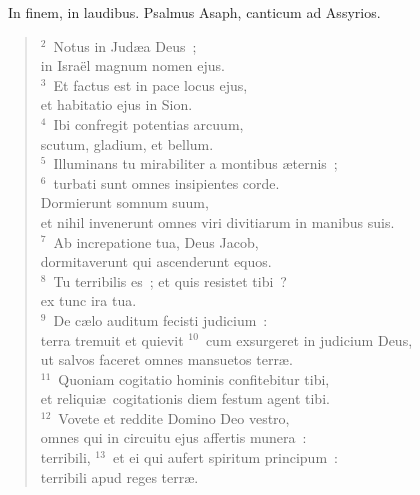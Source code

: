 ~\lettrine[lines=10,image=true,loversize=0.05,lraise=-0.03]{I}{}n finem, in laudibus. Psalmus Asaph, canticum ad Assyrios.
\begin{flushleft}\begin{verse}\vspace{6pt}${}^{2}$~Notus in Jud\ae a Deus~;\\ in Isra\"el magnum nomen ejus.\\
${}^{3}$~Et factus est in pace locus ejus,\\ et habitatio ejus in Sion.\\
${}^{4}$~Ibi confregit potentias arcuum,\\ scutum, gladium, et bellum.\\
${}^{5}$~Illuminans tu mirabiliter a montibus \ae ternis~;\\
${}^{6}$~turbati sunt omnes insipientes corde.\\ Dormierunt somnum suum,\\ et nihil invenerunt omnes viri divitiarum in manibus suis.\\
${}^{7}$~Ab increpatione tua, Deus Jacob,\\ dormitaverunt qui ascenderunt equos.\\
${}^{8}$~Tu terribilis es~; et quis resistet tibi~?\\ ex tunc ira tua.\\
${}^{9}$~De c\ae lo auditum fecisti judicium~:\\ terra tremuit et quievit
${}^{10}$~cum exsurgeret in judicium Deus,\\ ut salvos faceret omnes mansuetos terr\ae .\\
${}^{11}$~Quoniam cogitatio hominis confitebitur tibi,\\ et reliqui\ae\ cogitationis diem festum agent tibi.\\
${}^{12}$~Vovete et reddite Domino Deo vestro,\\ omnes qui in circuitu ejus affertis munera~:\\ terribili,
${}^{13}$~et ei qui aufert spiritum principum~:\\ terribili apud reges terr\ae .\end{verse}\end{flushleft}


